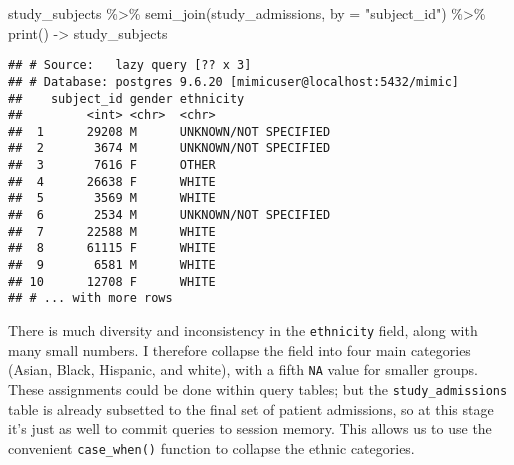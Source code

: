 \documentclass[
]{article}
\newenvironment{Shaded}{\begin{snugshade}}{\end{snugshade}}
\newcommand{\AttributeTok}[1]{\textcolor[rgb]{0.77,0.63,0.00}{#1}}
\newcommand{\FunctionTok}[1]{\textcolor[rgb]{0.00,0.00,0.00}{#1}}
\newcommand{\NormalTok}[1]{#1}
\newcommand{\OtherTok}[1]{\textcolor[rgb]{0.56,0.35,0.01}{#1}}
\newcommand{\SpecialCharTok}[1]{\textcolor[rgb]{0.00,0.00,0.00}{#1}}
\newcommand{\StringTok}[1]{\textcolor[rgb]{0.31,0.60,0.02}{#1}}
\begin{document}
\begin{Shaded}
\begin{Highlighting}[]
\NormalTok{study\_subjects }\SpecialCharTok{\%\textgreater{}\%}
  \FunctionTok{semi\_join}\NormalTok{(study\_admissions, }\AttributeTok{by =} \StringTok{"subject\_id"}\NormalTok{) }\SpecialCharTok{\%\textgreater{}\%}
  \FunctionTok{print}\NormalTok{() }\OtherTok{{-}\textgreater{}}\NormalTok{ study\_subjects}
\end{Highlighting}
\end{Shaded}

\begin{verbatim}
## # Source:   lazy query [?? x 3]
## # Database: postgres 9.6.20 [mimicuser@localhost:5432/mimic]
##    subject_id gender ethnicity            
##         <int> <chr>  <chr>                
##  1      29208 M      UNKNOWN/NOT SPECIFIED
##  2       3674 M      UNKNOWN/NOT SPECIFIED
##  3       7616 F      OTHER                
##  4      26638 F      WHITE                
##  5       3569 M      WHITE                
##  6       2534 M      UNKNOWN/NOT SPECIFIED
##  7      22588 M      WHITE                
##  8      61115 F      WHITE                
##  9       6581 M      WHITE                
## 10      12708 F      WHITE                
## # ... with more rows
\end{verbatim}

There is much diversity and inconsistency in the \texttt{ethnicity}
field, along with many small numbers. I therefore collapse the field
into four main categories (Asian, Black, Hispanic, and white), with a
fifth \texttt{NA} value for smaller groups. These assignments could be
done within query tables; but the \texttt{study\_admissions} table is
already subsetted to the final set of patient admissions, so at this
stage it's just as well to commit queries to session memory. This allows
us to use the convenient \texttt{case\_when()} function to collapse the
ethnic categories.
\end{document}
